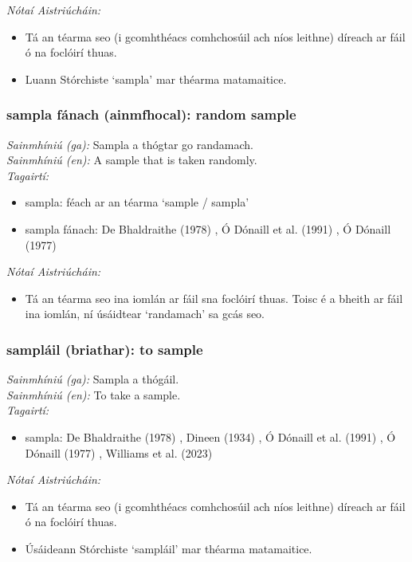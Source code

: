\documentclass{article}
\begin{document}
 \noindent \textit{Nótaí Aistriúcháin:}
\begin{itemize}
	\item Tá an téarma seo (i gcomhthéacs comhchosúil ach níos leithne) díreach ar fáil ó na foclóirí thuas.
	\item Luann Stórchiste `sampla' mar théarma matamaitice.
\end{itemize}


\subsubsection*{sampla fánach (ainmfhocal): random sample}
 \noindent \textit{Sainmhíniú (ga):} Sampla a thógtar go randamach.
\\
 \noindent \textit{Sainmhíniú (en):} A sample that is taken randomly.
\\
 \noindent \textit{Tagairtí:}
\begin{itemize}
	\item sampla: féach ar an téarma `sample / sampla'
	\item sampla fánach: De Bhaldraithe (1978) \cite{de-bhaldraithe}, Ó Dónaill et al. (1991) \cite{focloir-beag}, Ó Dónaill (1977) \cite{odonaill}
\end{itemize}

 \noindent \textit{Nótaí Aistriúcháin:}
\begin{itemize}
	\item Tá an téarma seo ina iomlán ar fáil sna foclóirí thuas. Toisc é a bheith ar fáil ina iomlán, ní úsáidtear `randamach' sa gcás seo.
\end{itemize}


\subsubsection*{sampláil (briathar): to sample}
 \noindent \textit{Sainmhíniú (ga):} Sampla a thógáil.
\\
 \noindent \textit{Sainmhíniú (en):} To take a sample.
\\
 \noindent \textit{Tagairtí:}
\begin{itemize}
	\item sampla: De Bhaldraithe (1978) \cite{de-bhaldraithe}, Dineen (1934) \cite{dineen}, Ó Dónaill et al. (1991) \cite{focloir-beag}, Ó Dónaill (1977) \cite{odonaill}, Williams et al. (2023) \cite{storchiste}
\end{itemize}

 \noindent \textit{Nótaí Aistriúcháin:}
\begin{itemize}
	\item Tá an téarma seo (i gcomhthéacs comhchosúil ach níos leithne) díreach ar fáil ó na foclóirí thuas.
	\item Úsáideann Stórchiste `sampláil' mar théarma matamaitice.
\end{itemize}
\end{document}
